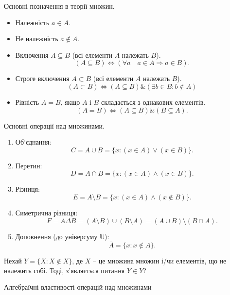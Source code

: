 Основні позначення в теорії множин.
\begin{itemize}
    \item Належність $a \in A$.
    \item Не належність $a \not\in A$.
    \item Включення $A \subseteq B$ (всі елементи $A$ належать $B$).
    $$(A \subseteq B) \Leftrightarrow (\forall a \quad a \in A \Rightarrow a \in B).$$

    \item Строге включення $A \subset B$ (всі елементи $A$ належать $B$).
    $$(A \subset B) \Leftrightarrow (A \subseteq B) \& (\exists b \in B: b \not\in A)$$

    \item Рівність $A = B$, якщо $A$ і $B$ складається з однакових елементів.
    $$(A = B) \Leftrightarrow (A \subseteq B) \& (B \subseteq A).$$
\end{itemize}

Основні операції над множинами.
\begin{enumerate}
    \item Об'єднання:
    $$C = A \cup B = \{x: (x \in A) \vee (x \in B)\}.$$

    \item Перетин:
    $$D = A \cap B = \{x: (x \in A) \wedge (x \in B)\}.$$

    \item Різниця:
    $$E = A \setminus B = \{x: (x \in A) \wedge (x \not\in B)\}.$$

    \item Симетрична різниця:
    $$F = A \Delta B = (A \setminus B) \cup (B \setminus A) = (A \cup B) \setminus (B \cap A).$$

    \item Доповнення (до універсуму $\mathbb{U}$):
    $$\overline{A} = \{x: x \not\in A\}.$$
\end{enumerate}

\begin{claim}
    Нехай $Y = \{X: X \not\in X\}$, де $X$ -- це множина множин і/чи елементів, що не належить собі. Тоді, з'являється питання $Y \in Y$?
\end{claim}
    
Алгебраїчні властивості операцій над множинами

